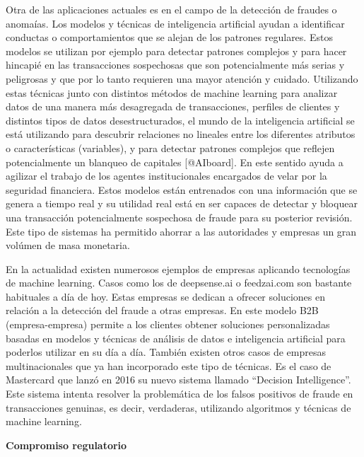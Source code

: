 \documentclass[]{article}
\begin{document}
Otra de las aplicaciones actuales es en el campo de la detección de
fraudes o anomaías. Los modelos y técnicas de inteligencia artificial
ayudan a identificar conductas o comportamientos que se alejan de los
patrones regulares. Estos modelos se utilizan por ejemplo para detectar
patrones complejos y para hacer hincapié en las transacciones
sospechosas que son potencialmente más serias y peligrosas y que por lo
tanto requieren una mayor atención y cuidado. Utilizando estas técnicas
junto con distintos métodos de machine learning para analizar datos de
una manera más desagregada de transacciones, perfiles de clientes y
distintos tipos de datos desestructurados, el mundo de la inteligencia
artificial se está utilizando para descubrir relaciones no lineales
entre los diferentes atributos o características (variables), y para
detectar patrones complejos que reflejen potencialmente un blanqueo de
capitales {[}@AIboard{]}. En este sentido ayuda a agilizar el trabajo de
los agentes institucionales encargados de velar por la seguridad
financiera. Estos modelos están entrenados con una información que se
genera a tiempo real y su utilidad real está en ser capaces de detectar
y bloquear una transacción potencialmente sospechosa de fraude para su
posterior revisión. Este tipo de sistemas ha permitido ahorrar a las
autoridades y empresas un gran volúmen de masa monetaria.

\setlength\parskip{5ex}

En la actualidad existen numerosos ejemplos de empresas aplicando
tecnologías de machine learning. Casos como los de deepsense.ai o
feedzai.com son bastante habituales a día de hoy. Estas empresas se
dedican a ofrecer soluciones en relación a la detección del fraude a
otras empresas. En este modelo B2B (empresa-empresa) permite a los
clientes obtener soluciones personalizadas basadas en modelos y técnicas
de análisis de datos e inteligencia artificial para poderlos utilizar en
su día a día. También existen otros casos de empresas multinacionales
que ya han incorporado este tipo de técnicas. Es el caso de Mastercard
que lanzó en 2016 su nuevo sistema llamado ``Decision Intelligence''.
Este sistema intenta resolver la problemática de los falsos positivos de
fraude en transacciones genuinas, es decir, verdaderas, utilizando
algoritmos y técnicas de machine learning.

\textbf{Compromiso regulatorio}
\end{document}

